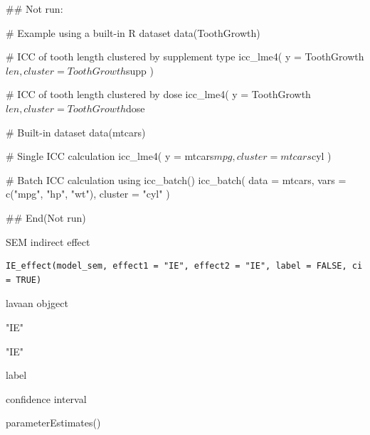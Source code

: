 \documentclass[a4paper]{book}
\begin{document}
%
\begin{Examples}
\begin{ExampleCode}
## Not run: 

# Example using a built-in R dataset
data(ToothGrowth)

# ICC of tooth length clustered by supplement type
icc_lme4(
  y = ToothGrowth$len,
  cluster = ToothGrowth$supp
)

# ICC of tooth length clustered by dose
icc_lme4(
  y = ToothGrowth$len,
  cluster = ToothGrowth$dose


# Built-in dataset
data(mtcars)

# Single ICC calculation
icc_lme4(
  y = mtcars$mpg,
  cluster = mtcars$cyl
)

# Batch ICC calculation using icc_batch()
icc_batch(
  data = mtcars,
  vars = c("mpg", "hp", "wt"),
  cluster = "cyl"
)

## End(Not run)
\end{ExampleCode}
\end{Examples}
%
\begin{Description}
SEM indirect effect
\end{Description}
%
\begin{Usage}
\begin{verbatim}
IE_effect(model_sem, effect1 = "IE", effect2 = "IE", label = FALSE, ci = TRUE)
\end{verbatim}
\end{Usage}
%
\begin{Arguments}
\begin{ldescription}
\item[\code{model\_sem}] lavaan objgect

\item[\code{effect1}] "IE"

\item[\code{effect2}] "IE"

\item[\code{label}] label

\item[\code{ci}] confidence interval
\end{ldescription}
\end{Arguments}
%
\begin{Value}
parameterEstimates()
\end{Value}
%
\end{document}
